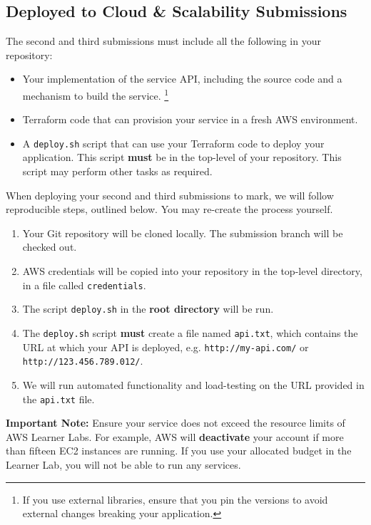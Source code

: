 \documentclass{csse4400}
\begin{document}
\newpage
\begin{samepage}
\subsection{Deployed to Cloud \& Scalability Submissions}
The second and third submissions must include all the following in your repository:
\begin{itemize}
  \item Your implementation of the service API, including the source code and a mechanism to build the service.%
        \footnote{If you use external libraries,
                  ensure that you pin the versions to avoid external changes breaking your application.}
  \item Terraform code that can provision your service in a fresh AWS environment.
  \item A \texttt{deploy.sh} script that can use your Terraform code to deploy your application.
        This script \textbf{must} be in the top-level of your repository.
        This script may perform other tasks as required.
\end{itemize}
\end{samepage}

\noindent
When deploying your second and third submissions to mark, we will follow reproducible steps, outlined below.
You may re-create the process yourself.

\begin{enumerate}
  \item Your Git repository will be cloned locally.
        The submission branch will be checked out.
  \item AWS credentials will be copied into your repository in the top-level directory,
        in a file called \texttt{credentials}.
  \item The script \texttt{deploy.sh} in the \textbf{root directory} will be run.
  \item The \texttt{deploy.sh} script \textbf{must} create a file named \texttt{api.txt},
        which contains the URL at which your API is deployed,
        e.g. \texttt{http://my-api.com/} or \texttt{http://123.456.789.012/}.
  \item We will run automated functionality and load-testing on the URL provided in the \texttt{api.txt} file.
\end{enumerate}

\noindent
\textbf{Important Note:} Ensure your service does not exceed the resource limits of AWS Learner Labs.
For example, AWS will \textbf{deactivate} your account if more than fifteen EC2 instances are running.
If you use your allocated budget in the Learner Lab, you will not be able to run any services.
\end{document}
